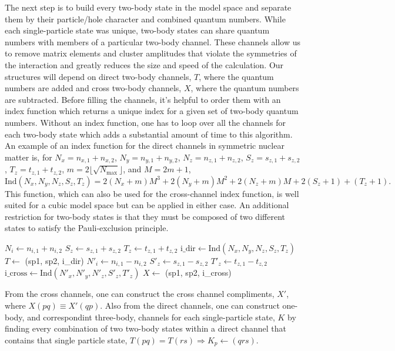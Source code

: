 The next step is to build every two-body state in the model space and separate them by their particle/hole character and combined quantum numbers. While each single-particle state was unique, two-body states can share quantum numbers with members of a particular two-body channel. These channels allow us to remove matrix elements and cluster amplitudes that violate the symmetries of the interaction and greatly reduces the size and speed of the calculation. Our structures will depend on direct two-body channels, $T$, where the quantum numbers are added and cross two-body channels, $X$, where the quantum numbers are subtracted. Before filling the channels, it's helpful to order them with an index function which returns a unique index for a given set of two-body quantum numbers. Without an index function, one has to loop over all the channels for each two-body state which adds a substantial amount of time to this algorithm. An example of an index function for the direct channels in symmetric nuclear matter is, for $N_{x}=n_{x,1}+n_{x,2}$, $N_{y}=n_{y,1}+n_{y,2}$, $N_{z}=n_{z,1}+n_{z,2}$, $S_{z}=s_{z,1}+s_{z,2}$, $T_{z}=t_{z,1}+t_{z,2}$, $m=2\lfloor\sqrt{N_{\text{max}}}\rfloor$, and $M=2m+1$,
\begin{equation}
\text{Ind}\left( N_{x},N_{y},N_{z},S_{z},T_{z}\right)=2\left( N_{x}+m\right)M^{3}+2\left( N_{y}+m\right)M^{2}+2\left( N_{z}+m\right)M+2\left( S_{z}+1\right)+\left(T_{z}+1\right).
\end{equation}
This function, which can also be used for the cross-channel index function, is well suited for a cubic model space but can be applied in either case. An additional restriction for two-body states is that they must be composed of two different states to satisfy the Pauli-exclusion principle. 

\begin{algorithmic}
  \State $N_{i}\gets n_{i,1}+n_{i,2}$
  \State $S_{z}\gets s_{z,1}+s_{z,2}$
  \State $T_{z}\gets t_{z,1}+t_{z,2}$
  \State $\text{i\_dir}\gets\text{Ind}\left(N_{x},N_{y},N_{z},S_{z},T_{z}\right)$
  \State $T\gets$ (sp1, sp2, i\_dir)
  \State $N'_{i}\gets n_{i,1}-n_{i,2}$
  \State $S'_{z}\gets s_{z,1}-s_{z,2}$
  \State $T'_{z}\gets t_{z,1}-t_{z,2}$
  \State $\text{i\_cross}\gets\text{Ind}\left(N'_{x},N'_{y},N'_{z},S'_{z},T'_{z}\right)$
  \State $X\gets$ (sp1, sp2, i\_cross)
  \EndIf
  \EndFor
  \EndFor
\end{algorithmic}

From the cross channels, one can construct the cross channel compliments, $X'$, where $X\left( pq\right)\equiv X'\left( qp\right)$. Also from the direct channels, one can construct one-body, and correspondint three-body, channels for each single-particle state, $K$ by finding every combination of two two-body states within a direct channel that contains that single particle state, $T\left( pq\right)=T\left( rs\right)\Rightarrow K_{p}\gets\left( qrs\right)$.

